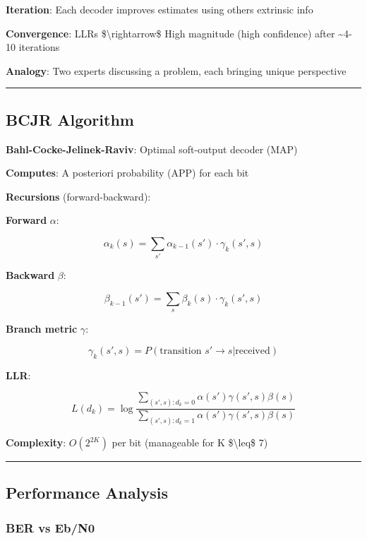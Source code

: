 \textbf{Iteration}: Each decoder improves estimates using
other\textquotesingle s extrinsic info

\textbf{Convergence}: LLRs \$\textbackslash rightarrow\$ High magnitude
(high confidence) after \textasciitilde4-10 iterations

\textbf{Analogy}: Two experts discussing a problem, each bringing unique
perspective

\begin{center}\rule{0.5\linewidth}{0.5pt}\end{center}

\subsection{BCJR Algorithm}\label{bcjr-algorithm}

\textbf{Bahl-Cocke-Jelinek-Raviv}: Optimal soft-output decoder (MAP)

\textbf{Computes}: A posteriori probability (APP) for each bit

\textbf{Recursions} (forward-backward):

\textbf{Forward} \(\alpha\):

\[
\alpha_k(s) = \sum_{s'} \alpha_{k-1}(s') \cdot \gamma_k(s', s)
\]

\textbf{Backward} \(\beta\):

\[
\beta_{k-1}(s') = \sum_{s} \beta_k(s) \cdot \gamma_k(s', s)
\]

\textbf{Branch metric} \(\gamma\):

\[
\gamma_k(s', s) = P(\text{transition } s' \to s | \text{received})
\]

\textbf{LLR}:

\[
L(d_k) = \log\frac{\sum_{(s',s): d_k=0} \alpha(s') \gamma(s',s) \beta(s)}{\sum_{(s',s): d_k=1} \alpha(s') \gamma(s',s) \beta(s)}
\]

\textbf{Complexity}: \(O(2^{2K})\) per bit (manageable for K
\$\textbackslash leq\$ 7)

\begin{center}\rule{0.5\linewidth}{0.5pt}\end{center}

\subsection{Performance Analysis}\label{performance-analysis}

\subsubsection{BER vs Eb/N0}\label{ber-vs-ebn0}

